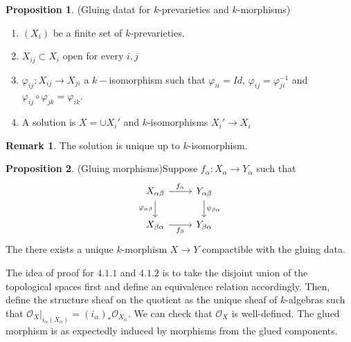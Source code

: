 \documentclass{article}
\theoremstyle{definition}
\theoremstyle{definition}
\theoremstyle{definition}
\newtheorem{remark}{Remark}[theorem]
\theoremstyle{definition}
\newtheorem{proposition}{Proposition}[theorem]
\theoremstyle{definition}
\theoremstyle{definition}
\theoremstyle{definition}
\begin{document}
\begin{tcolorbox}[colback=blue!5!white,colframe=blue!30!white]
\begin{proposition}
(Gluing datat for $k$-prevarieties and $k$-morphisms) 
\begin{enumerate}
    \item $(X_i)$ be a finite set of $k$-prevarieties. 
    \item $X_{ij}\subset X_i$ open for every $i,j$
    \item $\varphi_{ij}: X_{ij}\to X_{ji}$ a $k-$isomorphism such that $\varphi_{ii}=Id$, $\varphi_{ij}=\varphi_{ji}^{-1}$ and $\varphi_{ij}\circ \varphi_{jk}=\varphi_{ik}$. 
    \item A solution is $X=\cup X_i'$ and $k$-isomorphisms $X_i'\to X_i$
\end{enumerate}
\end{proposition}
\end{tcolorbox}

\begin{tcolorbox}[colback=green!5!white,colframe=green!30!white]
\begin{remark}
The solution is unique up to $k$-isomorphism. 
\end{remark}
\end{tcolorbox}

\begin{tcolorbox}[colback=blue!5!white,colframe=blue!30!white]
\begin{proposition}
(Gluing morphisms)Suppose $f_{\alpha}: X_{\alpha}\to Y_{\alpha}$ such that 
\[\begin{tikzcd}
	{X_{\alpha\beta}} & {Y_{\alpha\beta}} \\
	{X_{\beta\alpha}} & {Y_{\beta\alpha}}
	\arrow["{f_{\alpha}}", from=1-1, to=1-2]
	\arrow["{\varphi_{\alpha\beta}}"', from=1-1, to=2-1]
	\arrow["{\psi_{\beta\alpha}}", from=1-2, to=2-2]
	\arrow["{f_{\beta}}"', from=2-1, to=2-2]
\end{tikzcd}\]
The there exists a unique $k$-morphism $X\to Y$ compactible with the gluing data. 
\end{proposition}
\end{tcolorbox}
The idea of proof for $4.1.1$ and $4.1.2$ is to take the disjoint union of the topological spaces first and define an equivalence relation accordingly. Then, define the structure sheaf on the quotient as the unique sheaf of $k$-algebras such that $\mathcal{O}_X|_{i_{\alpha}(X_{\alpha})}=(i_{\alpha})_*\mathcal{O}_{X_{\alpha}}$. We can check that $\mathcal{O}_X$ is well-defined. The glued morphism is as expectedly induced by morphisms from the glued components. 
\end{document}
